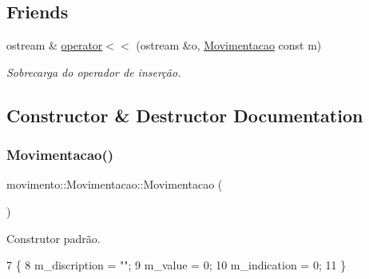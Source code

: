 \subsection*{Friends}
\begin{DoxyCompactItemize}
\item 
ostream \& \hyperlink{classmovimento_1_1Movimentacao_ae2bda6f6c4b1aa1aee55b9b98885117d}{operator$<$$<$} (ostream \&o, \hyperlink{classmovimento_1_1Movimentacao}{Movimentacao} const m)
\begin{DoxyCompactList}\small\item\em Sobrecarga do operador de inserção. \end{DoxyCompactList}\end{DoxyCompactItemize}


\subsection{Constructor \& Destructor Documentation}
\mbox{\label{classmovimento_1_1Movimentacao_a51a5e6aa20dda8f91388dd4431bbec6a}} 
\subsubsection{\texorpdfstring{Movimentacao()}{Movimentacao()}\hspace{0.1cm}{\footnotesize\ttfamily [1/2]}}
{\footnotesize\ttfamily movimento\+::\+Movimentacao\+::\+Movimentacao (\begin{DoxyParamCaption}{ }\end{DoxyParamCaption})}



Construtor padrão. 


\begin{DoxyCode}
7     \{
8         m\_discription = \textcolor{stringliteral}{""};
9         m\_value = 0;
10         m\_indication = 0;
11     \}
\end{DoxyCode}
\mbox{\label{classmovimento_1_1Movimentacao_a99f38d943e74eeb784595970a5753d55}} 
